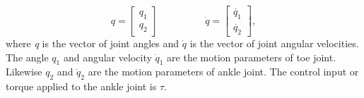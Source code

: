 \begin{equation}
	 q = 
	\begin{bmatrix}
		q_{1}\\
		q_{2}
	\end{bmatrix}
	\hspace{2cm}
	 \dot{q} = 
	\begin{bmatrix}
		\dot{q_{1}}\\
		\dot{q_{2}}
	\end{bmatrix},
\end{equation}
where \emph{q} is the vector of joint angles and $\dot{q}$ is the vector of joint angular velocities. The angle $q_1$ and angular velocity $\dot{q}_1$ are the motion parameters of toe joint. Likewise $q_2$ and $\dot{q}_2$ are the motion parameters of ankle joint. The control input or torque applied to the ankle joint is $\tau$. 

